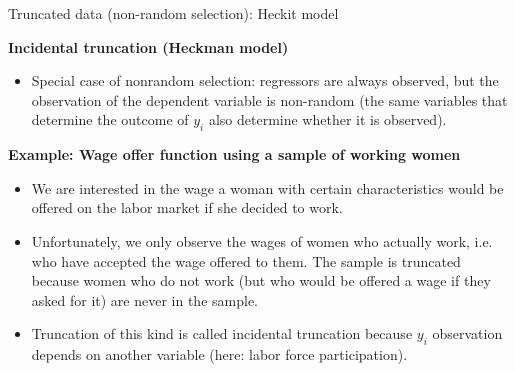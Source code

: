 \documentclass[usenames,dvipsnames]{beamer}
\begin{document}
\begin{frame}{Truncated data (non-random selection): Heckit model}

{\footnotesize
\textbf{Incidental truncation (Heckman model)}
\begin{itemize}
\item[] Special case of nonrandom selection: regressors are always observed, but the observation of the dependent variable is non-random (the same variables that determine the outcome of $y_i$ also determine whether it is observed).
\end{itemize}
\bigskip
\textbf{Example: Wage offer function using a sample of working women}
\begin{itemize}
\item We are interested in the wage a woman with certain characteristics would be offered on the labor market if she decided to work.\\
\medskip
\item Unfortunately, we only observe the wages of women who actually work, i.e. who have accepted the wage offered to them. The sample is truncated because women who do not work (but who would be offered a wage if they asked for it) are never in the sample.\\
\medskip
\item Truncation of this kind is called incidental truncation because $y_i$ observation depends on another variable (here: labor force participation).
\end{itemize}}
\end{frame}
\end{document}
